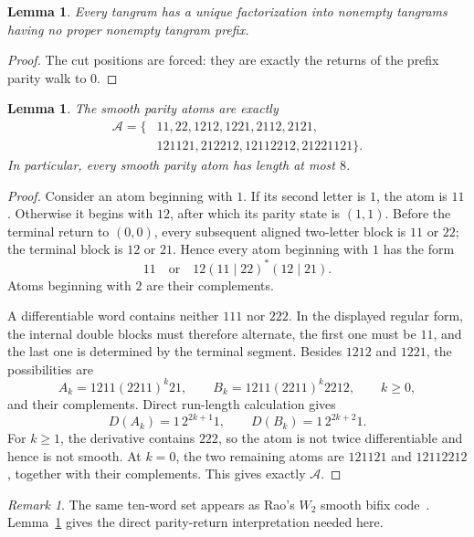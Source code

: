 \documentclass[11pt]{article}
\newtheorem{lemma}[theorem]{Lemma}
\theoremstyle{definition}
\theoremstyle{remark}
\newtheorem{remark}[theorem]{Remark}
\newcommand{\A}{\mathcal A}
\begin{document}
\begin{lemma}\label{lem:unique}
Every tangram has a unique factorization into nonempty tangrams having
no proper nonempty tangram prefix.
\end{lemma}

\begin{proof}
The cut positions are forced: they are exactly the returns of the prefix
parity walk to $0$.
\end{proof}

\begin{lemma}\label{lem:atoms}
The smooth parity atoms are exactly
\[
\begin{split}
\A=\{&
11,22,1212,1221,2112,2121,\\
&121121,212212,12112212,21221121\}.
\end{split}
\]
In particular, every smooth parity atom has length at most $8$.
\end{lemma}

\begin{proof}
Consider an atom beginning with $1$.  If its second letter is $1$, the
atom is $11$.  Otherwise it begins with $12$, after which its parity
state is $(1,1)$.  Before the terminal return to $(0,0)$, every
subsequent aligned two-letter block is $11$ or $22$; the terminal block is $12$ or
$21$.  Hence every atom beginning with $1$ has the form
\[
 11\quad\text{or}\quad 12(11\mid22)^*(12\mid21).
\]
Atoms beginning with $2$ are their complements.

A differentiable word contains neither $111$ nor $222$.  In the
displayed regular form, the internal double blocks must therefore
alternate, the first one must be $11$, and the last one is determined
by the terminal segment.  Besides $1212$ and $1221$, the possibilities
are
\[
 A_k=1211(2211)^k21,\qquad
 B_k=1211(2211)^k2212,\qquad k\ge0,
\]
and their complements.  Direct run-length calculation gives
\[
 D(A_k)=1\,2^{2k+1}1,\qquad
 D(B_k)=1\,2^{2k+2}1.
\]
For $k\ge1$, the derivative contains $222$, so the atom is not twice
differentiable and hence is not smooth.  At $k=0$, the two remaining
atoms are $121121$ and $12112212$, together with their complements.
This gives exactly $\A$.
\end{proof}

\begin{remark}
The same ten-word set appears as Rao's $W_2$ smooth bifix
code~\cite{Rao}.  Lemma~\ref{lem:atoms} gives the direct parity-return
interpretation needed here.
\end{remark}
\end{document}
